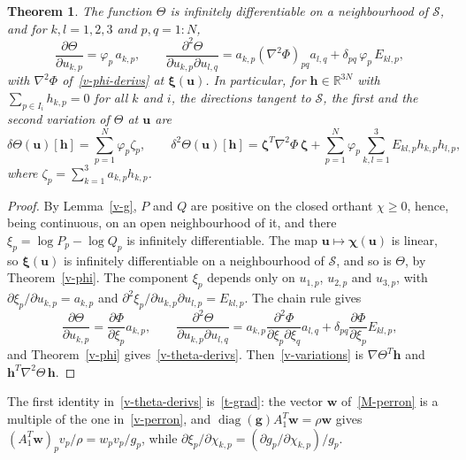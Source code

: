\documentclass[11pt]{article}
\theoremstyle{plain}
\newtheorem{theorem}{Theorem}[section]
\theoremstyle{remark}
\numberwithin{equation}{section}
\begin{document}
\begin{theorem}\label{v-theta}
The function $\Theta$ is infinitely differentiable on a neighbourhood of
$\mathcal{S}$, and for $k,l=1,2,3$ and $p,q=1:N$,
\begin{equation}\label{v-theta-derivs}
\frac{\partial\Theta}{\partial u_{k,p}}=\varphi_p\,a_{k,p},\qquad
\frac{\partial^2\Theta}{\partial u_{k,p}\partial u_{l,q}}
=a_{k,p}\left(\nabla^2\Phi\right)_{pq}a_{l,q}+\delta_{pq}\,\varphi_p\,E_{kl,p},
\end{equation}
with $\nabla^2\Phi$ of~\eqref{v-phi-derivs} at $\bm\xi(\bm u)$. In
particular, for $\bm h\in\mathbb{R}^{3N}$ with $\sum_{p\in I_i}h_{k,p}=0$
for all $k$ and $i$, the directions tangent to $\mathcal{S}$, the first and the second
variation of $\Theta$ at $\bm u$ are
\begin{equation}\label{v-variations}
\delta\Theta(\bm u)[\bm h]=\sum_{p=1}^{N}\varphi_p\zeta_p,\qquad
\delta^2\Theta(\bm u)[\bm h]=\bm\zeta^T\nabla^2\Phi\,\bm\zeta
+\sum_{p=1}^{N}\varphi_p\sum_{k,l=1}^{3}E_{kl,p}h_{k,p}h_{l,p},
\end{equation}
where $\zeta_p=\sum_{k=1}^{3}a_{k,p}h_{k,p}$.
\end{theorem}
\begin{proof}
By Lemma~\ref{v-g}, $P$ and $Q$ are positive on the closed orthant
$\chi\ge 0$, hence, being continuous, on an open neighbourhood of it, and there
$\xi_p=\log P_p-\log Q_p$ is infinitely differentiable. The map
$\bm u\mapsto\bm\chi(\bm u)$ is linear, so $\bm\xi(\bm u)$ is infinitely
differentiable on a neighbourhood of $\mathcal{S}$, and so is $\Theta$, by
Theorem~\ref{v-phi}. The component $\xi_p$ depends only on $u_{1,p}$,
$u_{2,p}$ and $u_{3,p}$, with
$\partial\xi_p/\partial u_{k,p}=a_{k,p}$ and
$\partial^2\xi_p/\partial u_{k,p}\partial u_{l,p}=E_{kl,p}$. The chain rule gives
\begin{equation}
\frac{\partial\Theta}{\partial u_{k,p}}=\frac{\partial\Phi}{\partial\xi_p}a_{k,p},\qquad
\frac{\partial^2\Theta}{\partial u_{k,p}\partial u_{l,q}}
=a_{k,p}\frac{\partial^2\Phi}{\partial\xi_p\partial\xi_q}a_{l,q}
+\delta_{pq}\frac{\partial\Phi}{\partial\xi_p}E_{kl,p},
\end{equation}
and Theorem~\ref{v-phi} gives~\eqref{v-theta-derivs}.
Then~\eqref{v-variations} is $\nabla\Theta^T\bm h$ and
$\bm h^T\nabla^2\Theta\,\bm h$.
\end{proof}

The first identity in~\eqref{v-theta-derivs} is~\eqref{t-grad}: the vector
$\bm w$ of~\eqref{M-perron} is a multiple of the one in~\eqref{v-perron}, and
$\operatorname{diag}(\bm g)A_1^T\bm w=\rho\bm w$ gives
$\left(A_1^T\bm w\right)_pv_p/\rho=w_pv_p/g_p$, while
$\partial\xi_p/\partial\chi_{k,p}=\left(\partial g_p/\partial\chi_{k,p}\right)/g_p$.
\end{document}
